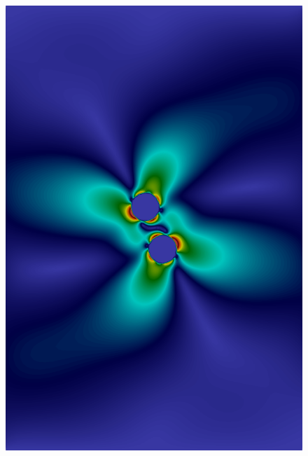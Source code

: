 \documentclass[graybox]{svmult}
\begin{document}
\begin{figure}
	\includegraphics[scale=0.14]{img-squirmer-t=2.5.png}

\end{figure}
\end{document}
